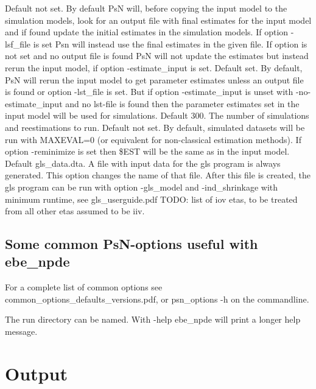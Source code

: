 \begin{optionlist}
Default not set. By default PsN will, before copying the input model to the simulation models, look for an output file with final estimates for the input model and if found update the initial estimates in the simulation models. If option -lsf\_file is set Psn will instead use the final estimates in the given file. If option is not set and no output file is found PsN will not update the estimates but instead rerun the input model, if option -estimate\_input is set. 
\nextopt
{}
Default set. By default, PsN will rerun the input model to get parameter estimates unless an output file is found or option -lst\_file is set. But if option -estimate\_input is unset with -no-estimate\_input and no lst-file is found then the parameter estimates set in the input model will be used for simulations. 
\nextopt
{}
Default 300. The number of simulations and reestimations to run. 
\nextopt
{}
Default not set. By default, simulated datasets will be run with MAXEVAL=0 (or equivalent for non-classical estimation methods). If option -reminimize is set then \$EST will be the same as in the input model. 
\nextopt
{}
Default gls\_data.dta. A file with input data for the gls program is always generated. This option changes the name of that file. After this file is created, the gls program can be run with option \mbox{-gls\_model} and -ind\_shrinkage with minimum runtime, see gls\_userguide.pdf 
\nextopt
{}
TODO: list of iov etas, to be treated from all other etas assumed to be iiv. 
\nextopt
\end{optionlist}



\subsection{Some common PsN-options useful with ebe\_npde}

For a complete list of common options see common\_options\_defaults\_versions.pdf, or psn\_options -h on the commandline.

\begin{optionlist}
The run directory can be named.  
\nextopt
{}
With -help ebe\_npde will print a longer help message. 
\nextopt
\end{optionlist}


\section{Output}

